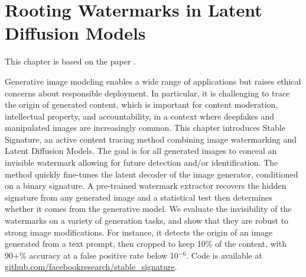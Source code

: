
\chapter[Rooting Watermarks in Latent Diffusion Models]{Rooting Watermarks in Latent Diffusion Models}\label{chapter:stable-signature}

This chapter is based on the paper .

Generative image modeling enables a wide range of applications but raises ethical concerns about responsible deployment.
In particular, it is challenging to trace the origin of generated content, which is important for content moderation, intellectual property, and accountability, in a context where deepfakes and manipulated images are increasingly common.
This chapter introduces Stable Signature, an active content tracing method combining image watermarking and Latent Diffusion Models. 
The goal is for all generated images to conceal an invisible watermark allowing for future detection and/or identification.
The method quickly fine-tunes the latent decoder of the image generator, conditioned on a binary signature.
A pre-trained watermark extractor recovers the hidden signature from any generated image and a statistical test then determines whether it comes from the generative model. 
We evaluate the invisibility of the watermarks on a variety of generation tasks, and show that they are robust to strong image modifications.
For instance, it detects the origin of an image generated from a text prompt, then cropped to keep 10\% of the content, with 90+\% accuracy at a false positive rate below 10$^{-6}$.
Code is available at \url{github.com/facebookresearch/stable_signature}.

\newpage









